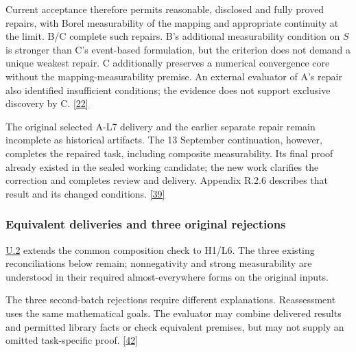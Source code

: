 Current acceptance therefore permits reasonable, disclosed and fully proved repairs, with Borel measurability of the mapping and appropriate continuity at the limit. B/C complete such repairs. B's additional measurability condition on $S$ is stronger than C's event-based formulation, but the criterion does not demand a unique weakest repair. C additionally preserves a numerical convergence core without the mapping-measurability premise. An external evaluator of A's repair also identified insufficient conditions; the evidence does not support exclusive discovery by C. \href{en.pdf\#ref-22}{\mbox{[22]}}

The original selected A-L7 delivery and the earlier separate repair remain incomplete as historical artifacts. The 13 September continuation, however, completes the repaired task, including composite measurability. Its final proof already existed in the sealed working candidate; the new work clarifies the correction and completes review and delivery. Appendix R.2.6 describes that result and its changed conditions. \href{en.pdf\#ref-39}{\mbox{[39]}}

\subsubsection[Equivalent deliveries and three original rejections]{\texorpdfstring{\protect\hypertarget{r1-5}{}Equivalent deliveries and three original rejections}{Equivalent deliveries and three original rejections}}
\hyperlink{u2}{U.2} extends the common composition check to H1/L6. The three existing reconciliations below remain; nonnegativity and strong measurability are understood in their required almost-everywhere forms on the original inputs.

The three second-batch rejections require different explanations. Reassessment uses the same mathematical goals. The evaluator may combine delivered results and permitted library facts or check equivalent premises, but may not supply an omitted task-specific proof. \href{en.pdf\#ref-42}{\mbox{[42]}}

